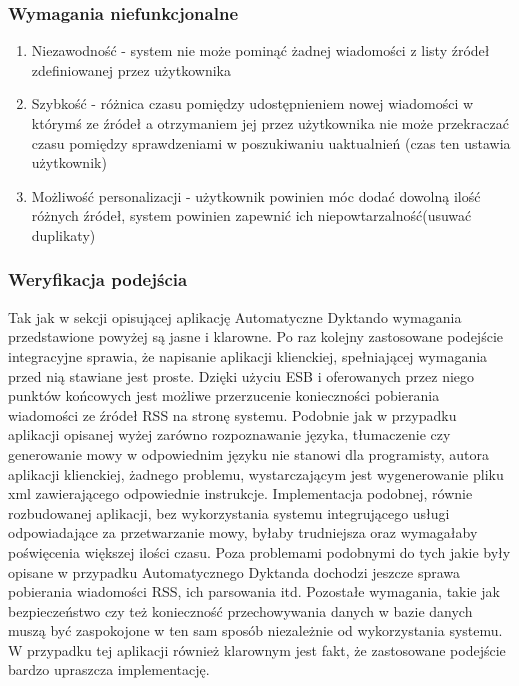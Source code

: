 \subsubsection{Wymagania niefunkcjonalne}
\begin{enumerate}
	\item Niezawodność - system nie może pominąć żadnej wiadomości z listy źródeł zdefiniowanej przez użytkownika
	\item Szybkość - różnica czasu pomiędzy udostępnieniem nowej wiadomości w którymś ze źródeł a otrzymaniem jej przez użytkownika nie może przekraczać czasu pomiędzy sprawdzeniami w poszukiwaniu uaktualnień (czas ten ustawia użytkownik)
	\item Możliwość personalizacji - użytkownik powinien móc dodać dowolną ilość różnych źródeł, system powinien zapewnić ich niepowtarzalność(usuwać duplikaty)
\end{enumerate}

\subsubsection{Weryfikacja podejścia}
Tak jak w sekcji opisującej aplikację Automatyczne Dyktando wymagania przedstawione powyżej są jasne i klarowne. Po raz kolejny zastosowane podejście integracyjne sprawia, że napisanie aplikacji klienckiej, spełniającej wymagania przed nią stawiane jest proste. Dzięki użyciu ESB i oferowanych przez niego punktów końcowych jest możliwe przerzucenie konieczności pobierania wiadomości ze źródeł RSS na stronę systemu. Podobnie jak w przypadku aplikacji opisanej wyżej zarówno rozpoznawanie języka, tłumaczenie czy generowanie mowy w odpowiednim języku nie stanowi dla programisty, autora aplikacji klienckiej, żadnego problemu, wystarczającym jest wygenerowanie pliku xml zawierającego odpowiednie instrukcje. Implementacja podobnej, równie rozbudowanej aplikacji, bez wykorzystania systemu integrującego usługi odpowiadające za przetwarzanie mowy, byłaby trudniejsza oraz wymagałaby poświęcenia większej ilości czasu. Poza problemami podobnymi do tych jakie były opisane w przypadku Automatycznego Dyktanda dochodzi jeszcze sprawa pobierania wiadomości RSS, ich parsowania itd. Pozostałe wymagania, takie jak bezpieczeństwo czy też konieczność przechowywania danych w bazie danych muszą być zaspokojone w ten sam sposób niezależnie od wykorzystania systemu. \\
W przypadku tej aplikacji również klarownym jest fakt, że zastosowane podejście bardzo upraszcza implementację.

